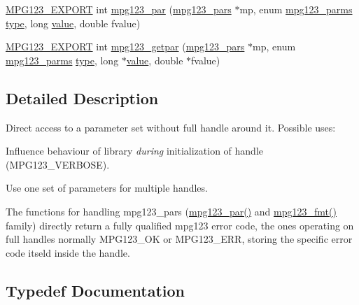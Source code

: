 \begin{DoxyCompactItemize}
\item 
\mbox{\hyperlink{mpg123_8h_a2ba98cfba3f760879df70e755b2a61cc}{M\+P\+G123\+\_\+\+E\+X\+P\+O\+RT}} int \mbox{\hyperlink{group__mpg123__advpar_gacf5f968dde49b648327ef601d9ff0367}{mpg123\+\_\+par}} (\mbox{\hyperlink{group__mpg123__advpar_ga3983578625af3bb6dc7e3b74d0cab4aa}{mpg123\+\_\+pars}} $\ast$mp, enum \mbox{\hyperlink{group__mpg123__init_ga73a8ff3363028b89afc72b3ea032b9cb}{mpg123\+\_\+parms}} \mbox{\hyperlink{_s_d_l__opengl_8h_ad5ddf6fca7b585646515660e810e0188}{type}}, long \mbox{\hyperlink{_s_d_l__opengl__glext_8h_a8ad81492d410ff2ac11f754f4042150f}{value}}, double fvalue)
\item 
\mbox{\hyperlink{mpg123_8h_a2ba98cfba3f760879df70e755b2a61cc}{M\+P\+G123\+\_\+\+E\+X\+P\+O\+RT}} int \mbox{\hyperlink{group__mpg123__advpar_ga290f6cf33a625af1376249b75eb8e7c8}{mpg123\+\_\+getpar}} (\mbox{\hyperlink{group__mpg123__advpar_ga3983578625af3bb6dc7e3b74d0cab4aa}{mpg123\+\_\+pars}} $\ast$mp, enum \mbox{\hyperlink{group__mpg123__init_ga73a8ff3363028b89afc72b3ea032b9cb}{mpg123\+\_\+parms}} \mbox{\hyperlink{_s_d_l__opengl_8h_ad5ddf6fca7b585646515660e810e0188}{type}}, long $\ast$\mbox{\hyperlink{_s_d_l__opengl__glext_8h_a8ad81492d410ff2ac11f754f4042150f}{value}}, double $\ast$fvalue)
\end{DoxyCompactItemize}


\subsection{Detailed Description}
Direct access to a parameter set without full handle around it. Possible uses\+:
\begin{DoxyItemize}
\item Influence behaviour of library {\itshape during} initialization of handle (M\+P\+G123\+\_\+\+V\+E\+R\+B\+O\+SE).
\item Use one set of parameters for multiple handles.
\end{DoxyItemize}

The functions for handling mpg123\+\_\+pars (\mbox{\hyperlink{group__mpg123__advpar_gacf5f968dde49b648327ef601d9ff0367}{mpg123\+\_\+par()}} and \mbox{\hyperlink{group__mpg123__advpar_ga481219fd8962c7b7ab69d4c8daebc094}{mpg123\+\_\+fmt()}} family) directly return a fully qualified mpg123 error code, the ones operating on full handles normally M\+P\+G123\+\_\+\+OK or M\+P\+G123\+\_\+\+E\+RR, storing the specific error code itseld inside the handle. 

\subsection{Typedef Documentation}
\mbox{\label{group__mpg123__advpar_ga3983578625af3bb6dc7e3b74d0cab4aa}} 
